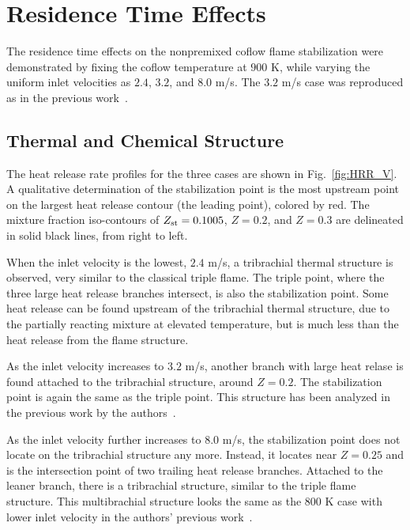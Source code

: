 \documentclass{wssci}
\begin{document}
\section{Residence Time Effects}

The residence time effects on the nonpremixed coflow flame stabilization were demonstrated by fixing the coflow temperature at $900$ K, while varying the uniform inlet velocities as $2.4$, $3.2$, and $8.0$ m/s.  The $3.2$ m/s case was reproduced as in the previous work~\cite{deng15}.

\subsection{Thermal and Chemical Structure}  
The heat release rate profiles for the three cases are shown in Fig.~\ref{fig:HRR_V}.  A qualitative determination of the stabilization point is the most upstream point on the largest heat release contour (the leading point), colored by red.  The mixture fraction iso-contours of $Z_{\rm st} = 0.1005$, $Z = 0.2$, and $Z = 0.3$ are delineated in solid black lines, from right to left.

When the inlet velocity is the lowest, $2.4$ m/s, a tribrachial thermal structure is observed, very similar to the classical triple flame.  The triple point, where the three large heat release branches intersect, is also the stabilization point.  Some heat release can be found upstream of the tribrachial thermal structure, due to the partially reacting mixture at elevated temperature, but is much less than the heat release from the flame structure. 

As the inlet velocity increases to $3.2$ m/s, another branch with large heat relase is found attached to the tribrachial structure, around $Z = 0.2$.  The stabilization point is again the same as the triple point.  This structure has been analyzed in the previous work by the authors~\cite{deng15}.

As the inlet velocity further increases to $8.0$ m/s, the stabilization point does not locate on the tribrachial structure any more.  Instead, it locates near $Z = 0.25$ and is the intersection point of two trailing heat release branches.  Attached to the leaner branch, there is a tribrachial structure, similar to the triple flame structure.  This multibrachial structure looks the same as the $800$ K case with lower inlet velocity in the authors' previous work~\cite{deng15}.
\end{document}
